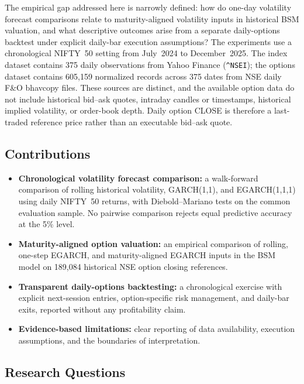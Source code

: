 \documentclass[journal]{IEEEtran}
\begin{document}
The empirical gap addressed here is narrowly defined: how do one-day volatility forecast comparisons relate to maturity-aligned volatility inputs in historical BSM valuation, and what descriptive outcomes arise from a separate daily-options backtest under explicit daily-bar execution assumptions? The experiments use a chronological NIFTY~50 setting from July~2024 to December~2025. The index dataset contains 375 daily observations from Yahoo Finance (\texttt{\string^NSEI}); the options dataset contains 605{,}159 normalized records across 375 dates from NSE daily F\&O bhavcopy files. These sources are distinct, and the available option data do not include historical bid--ask quotes, intraday candles or timestamps, historical implied volatility, or order-book depth. Daily option CLOSE is therefore a last-traded reference price rather than an executable bid--ask quote.

\subsection*{Contributions}

\begin{itemize}
\item \textbf{Chronological volatility forecast comparison:} a walk-forward comparison of rolling historical volatility, GARCH(1,1), and EGARCH(1,1,1) using daily NIFTY~50 returns, with Diebold--Mariano tests on the common evaluation sample. No pairwise comparison rejects equal predictive accuracy at the 5\% level. %
\item \textbf{Maturity-aligned option valuation:} an empirical comparison of rolling, one-step EGARCH, and maturity-aligned EGARCH inputs in the BSM model on 189{,}084 historical NSE option closing references.
\item \textbf{Transparent daily-options backtesting:} a chronological exercise with explicit next-session entries, option-specific risk management, and daily-bar exits, reported without any profitability claim.
\item \textbf{Evidence-based limitations:} clear reporting of data availability, execution assumptions, and the boundaries of interpretation.
\end{itemize}

\subsection*{Research Questions}
\end{document}
